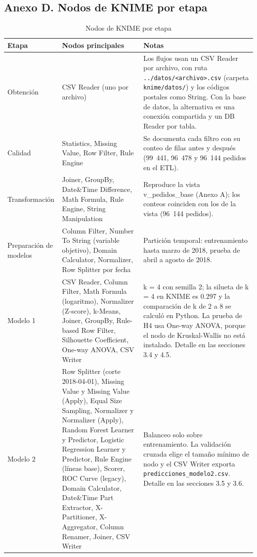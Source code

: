 \documentclass[a4paper,stu,12pt,donotrepeattitle,floatsintext]{apa7}
\begin{document}
\subsection{Anexo D. Nodos de KNIME por etapa}
{\footnotesize
\begin{longtable}{|>{\raggedright\arraybackslash}p{}|>{\raggedright\arraybackslash}p{}|>{\raggedright\arraybackslash}p{}|}
\caption{Nodos de KNIME por etapa}\\
\hline
\textbf{Etapa} & \textbf{Nodos principales} & \textbf{Notas} \\ \hline
\endhead
Obtención & CSV Reader (uno por archivo) & Los flujos usan un CSV Reader por archivo, con ruta \texttt{../\allowbreak{}datos/\allowbreak{}<archivo>.csv} (carpeta \texttt{knime/\allowbreak{}datos/\allowbreak{}}) y los códigos postales como String. Con la base de datos, la alternativa es una conexión compartida y un DB Reader por tabla. \\ \hline
Calidad & Statistics, Missing Value, Row Filter, Rule Engine & Se documenta cada filtro con su conteo de filas antes y después (99~441, 96~478 y 96~144 pedidos en el ETL). \\ \hline
Transformación & Joiner, GroupBy, Date\&Time Difference, Math Formula, Rule Engine, String Manipulation & Reproduce la vista v\_\allowbreak{}pedidos\_\allowbreak{}base (Anexo A); los conteos coinciden con los de la vista (96~144 pedidos). \\ \hline
Preparación de modelos & Column Filter, Number To String (variable objetivo), Domain Calculator, Normalizer, Row Splitter por fecha & Partición temporal: entrenamiento hasta marzo de 2018, prueba de abril a agosto de 2018. \\ \hline
Modelo 1 & CSV Reader, Column Filter, Math Formula (logaritmo), Normalizer (Z-score), k-Means, Joiner, GroupBy, Rule-based Row Filter, Silhouette Coefficient, One-way ANOVA, CSV Writer & k = 4 con semilla 2; la silueta de k = 4 en KNIME es 0.297 y la comparación de k de 2 a 8 se calculó en Python. La prueba de H4 usa One-way ANOVA, porque el nodo de Kruskal-Wallis no está instalado. Detalle en las secciones 3.4 y 4.5. \\ \hline
Modelo 2 & Row Splitter (corte 2018-04-01), Missing Value y Missing Value (Apply), Equal Size Sampling, Normalizer y Normalizer (Apply), Random Forest Learner y Predictor, Logistic Regression Learner y Predictor, Rule Engine (líneas base), Scorer, ROC Curve (legacy), Domain Calculator, Date\&Time Part Extractor, X-Partitioner, X-Aggregator, Column Renamer, Joiner, CSV Writer & Balanceo solo sobre entrenamiento. La validación cruzada elige el tamaño mínimo de nodo y el CSV Writer exporta \texttt{predicciones\_\allowbreak{}modelo2.csv}. Detalle en las secciones 3.5 y 3.6. \\ \hline

\end{longtable}}
\end{document}

